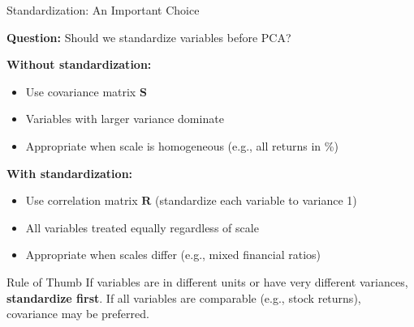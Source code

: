 \documentclass[10pt]{beamer}
\newcommand{\highlight}[1]{\textcolor{AccentOrange}{\textbf{#1}}}
\begin{document}
\begin{frame}{Standardization: An Important Choice}

  \textbf{Question:} Should we standardize variables before PCA?

  \vspace{1em}
  \textbf{Without standardization:}
  \begin{itemize}
    \item Use covariance matrix $\mathbf{S}$
    \item Variables with larger variance dominate
    \item Appropriate when scale is homogeneous (e.g., all returns in \%)
  \end{itemize}

  \vspace{0.5em}
  \textbf{With standardization:}
  \begin{itemize}
    \item Use correlation matrix $\mathbf{R}$ (standardize each variable to variance 1)
    \item All variables treated equally regardless of scale
    \item Appropriate when scales differ (e.g., mixed financial ratios)
  \end{itemize}

  \vspace{1em}
  \begin{block}{Rule of Thumb}
    If variables are in different units or have very different variances, \highlight{standardize first}. If all variables are comparable (e.g., stock returns), covariance may be preferred.
  \end{block}
\end{frame}

\end{document}
